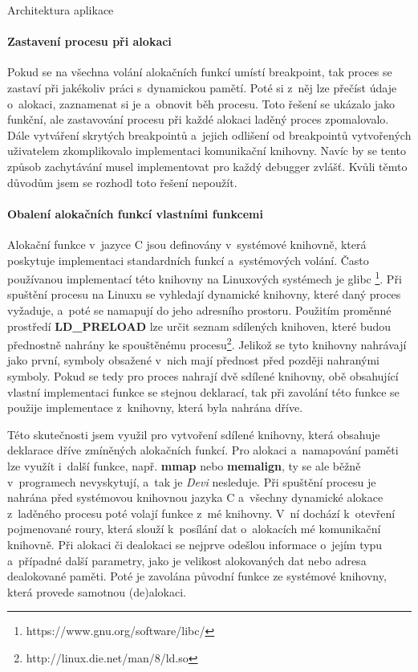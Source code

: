 \documentclass[czech,bachelor,male,python,dept460,hidelinks]{diploma}						%
\newcommand{\parspace}[1][]{
	\ifthenelse{\isempty{#1}}{\vspace{0mm}}{\vspace{#1}}
	\par
}
\begin{document}
\begin{section}{Architektura aplikace}
				\paragraph*{Zastavení procesu při alokaci} Pokud se na všechna volání alokačních funkcí umístí breakpoint, tak proces se zastaví při jakékoliv práci
				s~dynamickou pamětí. Poté si z~něj lze přečíst údaje o~alokaci, zaznamenat si je a~obnovit běh procesu. Toto řešení se ukázalo jako funkční,
				ale zastavování procesu při každé alokaci laděný proces zpomalovalo. Dále vytváření skrytých breakpointů a~jejich odlišení od breakpointů vytvořených
				uživatelem zkomplikovalo implementaci komunikační knihovny. Navíc by se tento způsob zachytávání musel
				implementovat pro každý debugger zvlášť. Kvůli těmto důvodům jsem se rozhodl toto řešení nepoužít.
				
				\paragraph*{Obalení alokačních funkcí vlastními funkcemi} Alokační funkce v~jazyce C jsou definovány v~systémové knihovně, která poskytuje
				implementaci standardních funkcí a~systémových volání. Často používanou implementací této knihovny na Linuxových systémech je glibc
				\footnote{https://www.gnu.org/software/libc/}. Při spuštění procesu na Linuxu se vyhledají dynamické knihovny, které daný proces vyžaduje,
				a~poté se namapují do jeho adresního prostoru. Použitím proměnné prostředí \textbf{LD\_PRELOAD} lze určit
				seznam sdílených knihoven, které budou přednostně nahrány ke spouštěnému procesu\footnote{http://linux.die.net/man/8/ld.so}.
				Jelikož se tyto knihovny nahrávají jako první, symboly obsažené v~nich mají přednost před později nahranými symboly. Pokud se tedy pro proces
				nahrají dvě sdílené knihovny, obě obsahující vlastní implementaci funkce se stejnou deklarací, tak při zavolání této funkce se použije
				implementace z~knihovny, která byla nahrána dříve.
				
				\parspace Této skutečnosti jsem využil pro vytvoření sdílené knihovny, která obsahuje deklarace dříve zmíněných alokačních funkcí.
				Pro alokaci a~namapování paměti lze využít i~další funkce, např. \textbf{mmap} nebo \textbf{memalign}, ty se ale běžně v~programech
				nevyskytují, a~tak je \textit{Devi} nesleduje.
				Při spuštění procesu je nahrána před systémovou knihovnou jazyka C a~všechny dynamické alokace z~laděného procesu poté volají funkce z~mé knihovny.
				V~ní dochází k~otevření pojmenované roury, která slouží k~posílání dat o~alokacích mé komunikační knihovně.
				Při alokaci či dealokaci se nejprve odešlou informace o~jejím typu a~případné další parametry, jako je velikost alokovaných dat
				nebo adresa dealokované paměti. Poté je zavolána původní funkce ze systémové knihovny, která provede samotnou (de)alokaci.
				

\end{section}
\end{document}
